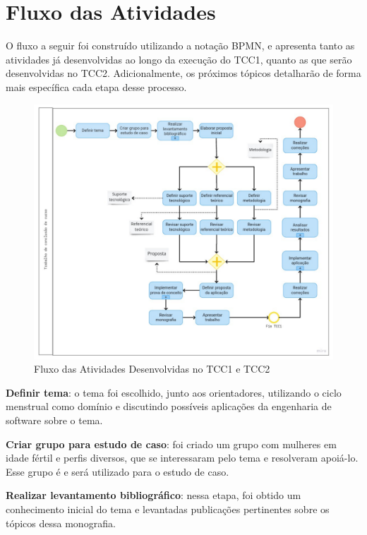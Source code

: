 \section{Fluxo das Atividades}

O fluxo a seguir foi construído utilizando a notação BPMN, e apresenta 
tanto as atividades já desenvolvidas ao longo da execução do 
TCC1, quanto as que serão desenvolvidas no TCC2. 
Adicionalmente, os próximos tópicos detalharão de 
forma mais específica cada etapa desse processo.

\begin{figure}[ht]
	\centering
	\includegraphics[keepaspectratio=true,scale=0.55]{figuras/fluxodeatividades.pdf}
	\caption{Fluxo das Atividades Desenvolvidas no TCC1 e TCC2}
        \label{fig03}
\end{figure}

\textbf{Definir tema}: o tema foi escolhido, junto aos orientadores, utilizando o ciclo menstrual como domínio e discutindo
possíveis aplicações da engenharia de software sobre o tema. 

\textbf{Criar grupo para estudo de caso}: foi criado um grupo com mulheres em idade fértil e perfis diversos, 
que se interessaram pelo tema e resolveram apoiá-lo. Esse grupo é e será utilizado 
para o estudo de caso.

\textbf{Realizar levantamento bibliográfico}: nessa etapa, foi obtido um conhecimento 
inicial do tema e levantadas publicações pertinentes sobre os tópicos dessa monografia. 

